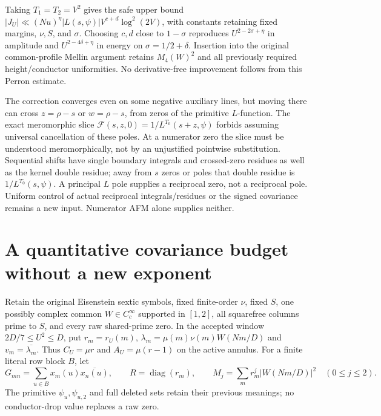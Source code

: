 \documentclass[11pt]{article}
\theoremstyle{definition}\newtheorem{definition}[theorem]{Definition}
\theoremstyle{remark}\newtheorem{remark}[theorem]{Remark}
\begin{document}
Taking $T_1=T_2=V^2$ gives the safe upper bound
$|J_U|\ll (Nu)^\eta |L(s,\psi)|V^{c+d}\log^2(2V)$, with constants
retaining fixed margins, $\nu,S$, and $\sigma$. Choosing $c,d$ close to
$1-\sigma$ reproduces $U^{2-2\sigma+\eta}$ in amplitude and
$U^{2-4\delta+\eta}$ in energy on $\sigma=1/2+\delta$.
Insertion into the original common-profile Mellin argument retains
$M_4(W)^2$ and all previously required height/conductor uniformities.
No derivative-free improvement follows from this Perron estimate.

The correction converges even on some negative auxiliary lines, but
moving there can cross $z=\rho-s$ or $w=\rho-s$, from zeros of the
primitive $L$-function. The exact meromorphic slice
$\mathcal F(s,z,0)=1/L^{T_0}(s+z,\psi)$ forbids assuming universal
cancellation of these poles. At a numerator zero the slice must be
understood meromorphically, not by an unjustified pointwise substitution.
Sequential shifts have single boundary integrals and crossed-zero
residues as well as the kernel double residue; away from $s$ zeros or
poles that double residue is $1/L^{T_0}(s,\psi)$.
A principal $L$ pole supplies a reciprocal zero, not a reciprocal pole.
Uniform control of actual reciprocal integrals/residues or the signed
covariance remains a new input. Numerator AFM alone supplies neither.

\section{A quantitative covariance budget without a new exponent}\label{cbq:core}
Retain the original Eisenstein sextic symbols, fixed finite-order $\nu$,
fixed $S$, one possibly complex common $W\in C_c^\infty$ supported in
$[1,2]$, all squarefree columns prime to $S$, and every raw shared-prime
zero. In the accepted window $2D/7\le U^2\le D$, put $r_m=r_U(m)$,
$\lambda_m=\mu(m)\nu(m)W(Nm/D)$ and $v_m=\overline{\lambda_m}$.
Thus $C_U=\mu r$ and $A_U=\mu(r-1)$ on the active annulus.
For a finite literal row block $B$, let
\[
 G_{mn}=\sum_{u\in B}x_m(u)\overline{x_n(u)},\qquad
 R=\operatorname{diag}(r_m),\qquad
 M_j=\sum_mr_m^j|W(Nm/D)|^2\quad(0\le j\le2).
\]
The primitive $\psi_u,\psi_{u,2}$ and full deleted sets retain their
previous meanings; no conductor-drop value replaces a raw zero.
\end{document}
